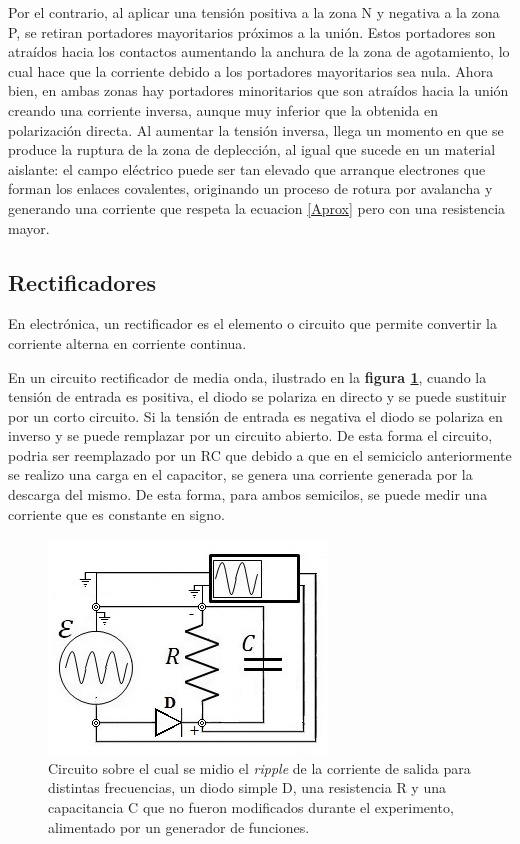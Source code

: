 \documentclass[11pt,a4paper]{article}
\begin{document}
 Por el contrario, al aplicar una tensión positiva a la zona N y negativa a la zona P, se retiran portadores mayoritarios próximos a la unión. Estos portadores son atraídos hacia los contactos aumentando la anchura de la zona de agotamiento, lo cual hace que la corriente debido a los portadores mayoritarios sea nula. Ahora bien, en ambas zonas hay portadores minoritarios que son atraídos hacia la unión creando una corriente inversa, aunque muy inferior que la obtenida en polarización directa. Al aumentar la tensión inversa, llega un momento en que se produce la ruptura de la zona de deplección, al igual que sucede en un material aislante: el campo eléctrico puede ser tan elevado que arranque electrones que forman los enlaces covalentes, originando un proceso de rotura por avalancha y generando una corriente que respeta la ecuacion \eqref{Aprox} pero con una resistencia mayor.


\subsection{Rectificadores}

En electrónica, un rectificador es el elemento o circuito que permite convertir la corriente alterna en corriente continua.

En un circuito rectificador de media onda, ilustrado en la \textbf{figura \ref{fig:Re-M-O}}, cuando la tensión de entrada es positiva, el diodo se polariza en directo y se puede sustituir por un corto circuito.  Si la tensión de entrada es negativa el diodo se polariza en inverso y se puede remplazar por un circuito abierto. De esta forma el circuito, podria ser reemplazado por un RC  que debido a que en el semiciclo anteriormente se realizo una carga en el capacitor, se genera una corriente generada por la descarga del mismo. De esta forma, para ambos semicilos, se puede medir una corriente que es constante en signo.

\begin{figure}[H]
\centering
\includegraphics[scale=0.8]{Rectificador-Media-Onda}
   \caption{Circuito sobre el cual se midio el \textit{ripple} de la corriente de salida para distintas frecuencias, un diodo simple D, una resistencia R y una capacitancia C que no fueron modificados durante el experimento, alimentado por un generador de funciones. }
   \label{fig:Re-M-O}
\end{figure}
\end{document}
